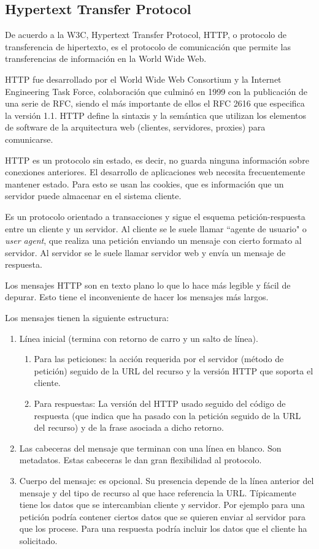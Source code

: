\subsection{Hypertext Transfer Protocol}
De acuerdo a la W3C\cite{noauthor_http_nodate}, Hypertext Transfer Protocol, HTTP, o protocolo de transferencia de hipertexto, es el protocolo de comunicación que permite las transferencias de información en la World Wide Web.


HTTP fue desarrollado por el World Wide Web Consortium y la Internet Engineering Task Force, colaboración que culminó en 1999 con la publicación de una serie de RFC, siendo el más importante de ellos el RFC 2616 que especifica la versión 1.1. HTTP define la sintaxis y la semántica que utilizan los elementos de software de la arquitectura web (clientes, servidores, proxies) para comunicarse.


HTTP es un protocolo sin estado, es decir, no guarda ninguna información sobre conexiones anteriores. El desarrollo de aplicaciones web necesita frecuentemente mantener estado. Para esto se usan las cookies, que es información que un servidor puede almacenar en el sistema cliente.


Es un protocolo orientado a transacciones y sigue el esquema petición-respuesta entre un cliente y un servidor. Al cliente se le suele llamar ``agente de usuario" o \textit{user agent}, que realiza una petición enviando un mensaje con cierto formato al servidor. Al servidor se le suele llamar servidor web y envía un mensaje de respuesta. 


Los mensajes HTTP son en texto plano lo que lo hace más legible y fácil de depurar. Esto tiene el inconveniente de hacer los mensajes más largos.

Los mensajes tienen la siguiente estructura:

\begin{enumerate}
    \item Línea inicial (termina con retorno de carro y un salto de línea).
    \begin{enumerate}
        \item Para las peticiones: la acción requerida por el servidor (método de petición) seguido de la URL del recurso y la versión HTTP que soporta el cliente.
        \item Para respuestas: La versión del HTTP usado seguido del código de respuesta (que indica que ha pasado con la petición seguido de la URL del recurso) y de la frase asociada a dicho retorno.        
    \end{enumerate}
    \item Las cabeceras del mensaje que terminan con una línea en blanco. Son metadatos. Estas cabeceras le dan gran flexibilidad al protocolo.
    \item Cuerpo del mensaje: es opcional. Su presencia depende de la línea anterior del mensaje y del tipo de recurso al que hace referencia la URL. Típicamente tiene los datos que se intercambian cliente y servidor. Por ejemplo para una petición podría contener ciertos datos que se quieren enviar al servidor para que los procese. Para una respuesta podría incluir los datos que el cliente ha solicitado.
\end{enumerate}

